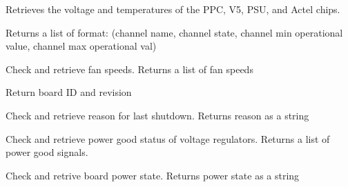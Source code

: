 \documentclass[letterpaper,10pt,english]{sphinxmanual}
\begin{document}
\begin{fulllineitems}

\begin{fulllineitems}
\label{index:xport.Xport.get_channels}
Retrieves the voltage and temperatures of the PPC, V5, PSU, and Actel chips.

Returns a list of format:
(channel name, channel state, channel min operational value, channel max operational val)

\end{fulllineitems}



\begin{fulllineitems}
\label{index:xport.Xport.get_fan_speeds}
Check and retrieve fan speeds. Returns a list of fan speeds

\end{fulllineitems}



\begin{fulllineitems}
\label{index:xport.Xport.get_id}
Return board ID and revision

\end{fulllineitems}



\begin{fulllineitems}
\label{index:xport.Xport.get_last_shutdown}
Check and retrieve reason for last shutdown. Returns reason as a string

\end{fulllineitems}



\begin{fulllineitems}
\label{index:xport.Xport.get_power_good}
Check and retrieve power good status of voltage regulators. Returns a list of power good signals.

\end{fulllineitems}



\begin{fulllineitems}
\label{index:xport.Xport.get_power_state}
Check and retrive board power state. Returns power state as a string


\end{fulllineitems}
\end{fulllineitems}
\end{document}
